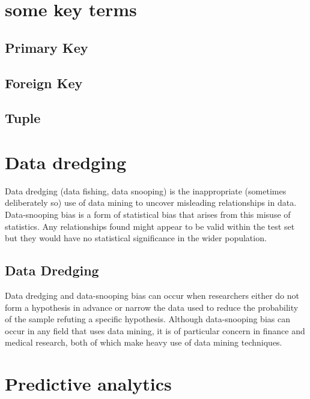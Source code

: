 \documentclass[12pt]{article}
\begin{document}
\newpage

\section{some key terms}
\subsection{Primary Key}
\subsection{Foreign Key}
\subsection{Tuple}


\section{Data dredging}

Data dredging (data fishing, data snooping) is the inappropriate (sometimes deliberately so) use of data mining to uncover misleading relationships in data. Data-snooping bias is a form of statistical bias that arises from this misuse of statistics. Any relationships found might appear to be valid within the test set but they would have no statistical significance in the wider population.
\subsection{Data Dredging}
Data dredging and data-snooping bias can occur when researchers either do not form a hypothesis in advance or narrow the data used to reduce the probability of the sample refuting a specific hypothesis. Although data-snooping bias can occur in any field that uses data mining, it is of particular concern in finance and medical research, both of which make heavy use of data mining techniques.



\section{Predictive analytics}
\end{document}
